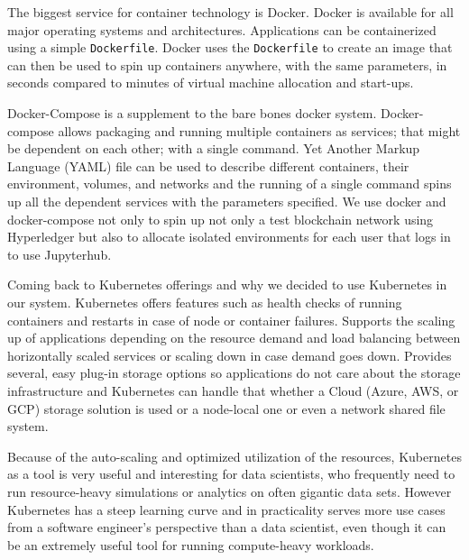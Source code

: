 \bigskip
The biggest service for container technology is Docker. Docker is available for all major operating systems and architectures. Applications can be containerized using a simple \lstinline{Dockerfile}. Docker uses the \lstinline{Dockerfile} to create an image that can then be used to spin up containers anywhere, with the same parameters, in seconds compared to minutes of virtual machine allocation and start-ups. 

\bigskip
Docker-Compose is a supplement to the bare bones docker system. Docker-compose allows packaging and running multiple containers as services; that might be dependent on each other; with a single command. Yet Another Markup Language (YAML) file can be used to describe different containers, their environment, volumes, and networks and the running of a single command spins up all the dependent services with the parameters specified. We use docker and docker-compose not only to spin up not only a test blockchain network using Hyperledger but also to allocate isolated environments for each user that logs in to use Jupyterhub.

\bigskip
Coming back to Kubernetes offerings and why we decided to use Kubernetes in our system. Kubernetes offers features such as health checks of running containers and restarts in case of node or container failures. Supports the scaling up of applications depending on the resource demand and load balancing between horizontally scaled services or scaling down in case demand goes down. Provides several, easy plug-in storage options so applications do not care about the storage infrastructure and Kubernetes can handle that whether a Cloud (Azure, AWS, or GCP) storage solution is used or a node-local one or even a network shared file system.

\bigskip
Because of the auto-scaling and optimized utilization of the resources, Kubernetes as a tool is very useful and interesting for data scientists, who frequently need to run resource-heavy simulations or analytics on often gigantic data sets. However Kubernetes has a steep learning curve and in practicality serves more use cases from a software engineer's perspective than a data scientist, even though it can be an extremely useful tool for running compute-heavy workloads. 

